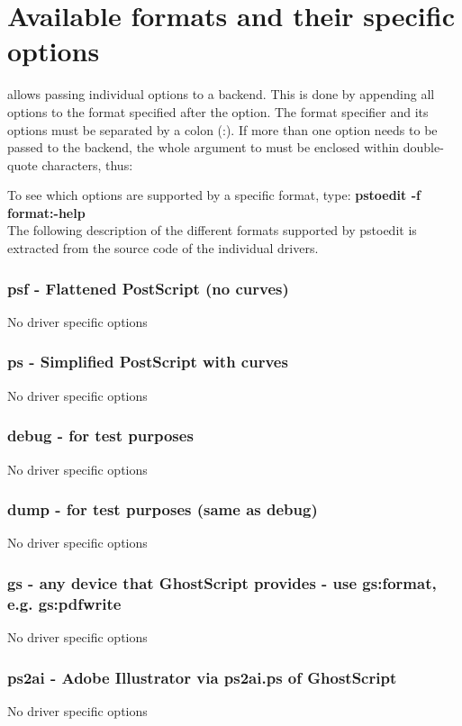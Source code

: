 \documentclass[english,a4paper]{article}
\begin{document}
\section{Available formats and their specific options}

 allows passing individual options to a backend. This is done by
appending all options to the format specified after the  option. The format
specifier and its options must be separated by a colon (:). If more than one
option needs to be passed to the backend, the whole argument to  must be
enclosed within double-quote characters, thus:


To see which options are supported by a specific format, type:
     \textbf{pstoedit -f format:-help}  
     \\ 

The following description of the different formats supported by pstoedit is extracted from the source code of the individual drivers.


\subsubsection{psf - Flattened PostScript (no curves)}
No driver specific options
\subsubsection{ps - Simplified PostScript with curves}
No driver specific options
\subsubsection{debug - for test purposes}
No driver specific options
\subsubsection{dump - for test purposes (same as debug)}
No driver specific options
\subsubsection{gs - any device that GhostScript provides - use gs:format, e.g. gs:pdfwrite}
No driver specific options
\subsubsection{ps2ai - Adobe Illustrator via ps2ai.ps of GhostScript}
No driver specific options
\end{document}
